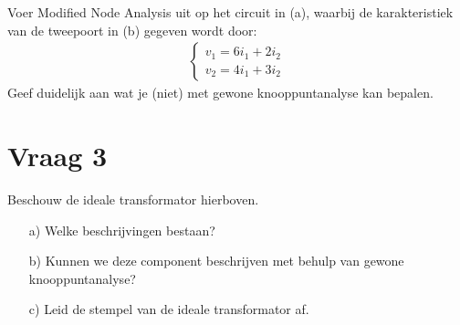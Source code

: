\documentclass[kulak]{kulakarticle}
\begin{document}
\begin{figure}[h!]
\begin{subfigure}{.49\textwidth}
			\caption{}
			\label{fig:b}
		\end{subfigure}
	\end{figure}

	Voer Modified Node Analysis uit op het circuit in (a), waarbij de karakteristiek van de tweepoort in (b) gegeven wordt door: \begin{align*}
		\begin{cases}
			v_1 = 6i_1 + 2i_2\\
			v_2 = 4i_1 + 3i_2
		\end{cases}
	\end{align*}
	Geef duidelijk aan wat je (niet) met gewone knooppuntanalyse kan bepalen.

	\newpage

	\newpage

	\section*{Vraag 3}

	\begin{figure}[h!]
		\centering
		
	\end{figure}

	Beschouw de ideale transformator hierboven.

	\begin{enumerate}
		\item[a)] Welke beschrijvingen bestaan?
		\item[b)] Kunnen we deze component beschrijven met behulp van gewone knooppuntanalyse?
		\item[c)] Leid de stempel van de ideale transformator af.
	\end{enumerate}

	\newpage
\end{document}

